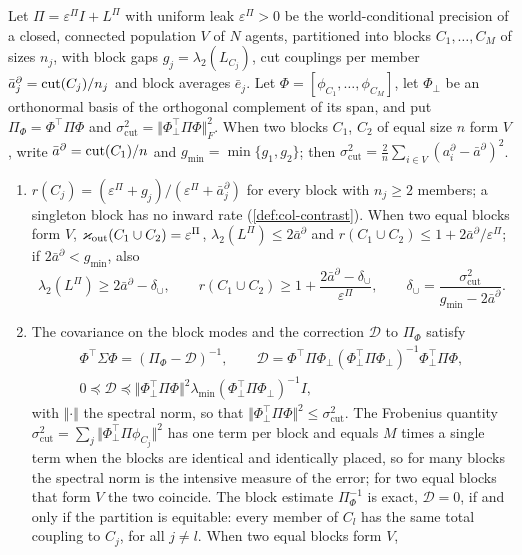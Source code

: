 \begin{theorem}\label{thm:col-bridge}
Let $\Pi=\varepsilon^\Pi I+L^\Pi$ with uniform leak $\varepsilon^\Pi>0$ be the world-conditional precision of a closed, connected population $V$ of $N$ agents, partitioned into blocks $C_1,\dots,C_M$ of sizes $n_j$, with block gaps $g_j=\lambda_2(L_{C_j})$, cut couplings per member $\bar a^\partial_j=\operatorname{cut}(C_j)/n_j$ and block averages $\bar e_j$. Let $\Phi=[\phi_{C_1},\dots,\phi_{C_M}]$, let $\Phi_\perp$ be an orthonormal basis of the orthogonal complement of its span, and put $\Pi_\Phi=\Phi^\top\Pi\Phi$ and $\sigma_{\mathrm{cut}}^2=\Vert\Phi_\perp^\top\Pi\Phi\Vert_F^2$. When two blocks $C_1$, $C_2$ of equal size $n$ form $V$, write $\bar a^\partial=\operatorname{cut}(C_1)/n$ and $g_{\min}=\min\{g_1,g_2\}$; then $\sigma^2_{\mathrm{cut}}=\frac2n\sum_{i\in V}(a^\partial_i-\bar a^\partial)^2$.
\begin{enumerate}
\item[(i)] $r(C_j)=(\varepsilon^\Pi+g_j)/(\varepsilon^\Pi+\bar a^\partial_j)$ for every block with $n_j\ge2$ members; a singleton block has no inward rate (\cref{def:col-contrast}). When two equal blocks form $V$, $\varkappa_{\mathrm{out}}(C_1\cup C_2)=\varepsilon^\Pi$, $\lambda_2(L^\Pi)\le2\bar a^\partial$ and $r(C_1\cup C_2)\le1+2\bar a^\partial/\varepsilon^\Pi$; if $2\bar a^\partial<g_{\min}$, also
\begin{equation}\label{eq:col-union}
\lambda_2(L^\Pi)\ge2\bar a^\partial-\delta_\cup,\qquad r(C_1\cup C_2)\ge1+\frac{2\bar a^\partial-\delta_\cup}{\varepsilon^\Pi},\qquad\delta_\cup=\frac{\sigma^2_{\mathrm{cut}}}{g_{\min}-2\bar a^\partial}.
\end{equation}
\item[(ii)] The covariance on the block modes and the correction $\mathcal D$ to $\Pi_\Phi$ satisfy
\begin{gather*}
\Phi^\top\Sigma\Phi=(\Pi_\Phi-\mathcal D)^{-1},\qquad\mathcal D=\Phi^\top\Pi\Phi_\perp(\Phi_\perp^\top\Pi\Phi_\perp)^{-1}\Phi_\perp^\top\Pi\Phi,\\
0\preceq\mathcal D\preceq\Vert\Phi_\perp^\top\Pi\Phi\Vert^2\lambda_{\min}(\Phi_\perp^\top\Pi\Phi_\perp)^{-1}I,
\end{gather*}
with $\Vert\cdot\Vert$ the spectral norm, so that $\Vert\Phi_\perp^\top\Pi\Phi\Vert^2\le\sigma^2_{\mathrm{cut}}$. The Frobenius quantity $\sigma^2_{\mathrm{cut}}=\sum_j\Vert\Phi_\perp^\top\Pi\phi_{C_j}\Vert^2$ has one term per block and equals $M$ times a single term when the blocks are identical and identically placed, so for many blocks the spectral norm is the intensive measure of the error; for two equal blocks that form $V$ the two coincide. The block estimate $\Pi_\Phi^{-1}$ is exact, $\mathcal D=0$, if and only if the partition is equitable: every member of $C_l$ has the same total coupling to $C_j$, for all $j\neq l$. When two equal blocks form $V$,

\end{enumerate}
\end{theorem}

